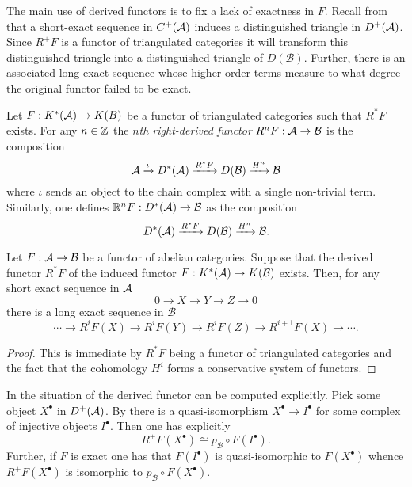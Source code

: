 The main use of derived functors is to fix a lack of exactness in $F$.
Recall from  that a short-exact sequence in $C^+(\AA)$ induces a distinguished triangle in $D^+(\AA)$.
Since $R^+F$ is a functor of triangulated categories it will transform this distinguished triangle into a distinguished triangle of $D(\mathcal{B})$.
Further, there is an associated long exact sequence whose higher-order terms measure to what degree the original functor failed to be exact.
\begin{definition}
 Let $F:K^*(\AA) \to K(B)$ be a functor of triangulated categories such that $R^*F$ exists.
 For any $n\in \Z$ the {\it $n$th right-derived functor} $R^nF:\AA \to \mathcal{B}$ is the composition
 $$\AA\xrightarrow{\iota} D^*(\AA) \xrightarrow{R^*F} D(\mathcal{B}) \xrightarrow{H^n} \mathcal{B} $$
 where $\iota$ sends an object to the chain complex with a single non-trivial term.
 Similarly, one defines $\mathbb{R}^nF:D^*(\AA)\to \mathcal{B}$ as the composition
 $$D^*(\AA) \xrightarrow{R^*F} D(\mathcal{B}) \xrightarrow{H^n} \mathcal{B}. $$
\end{definition}
\begin{proposition}
   Let $F:\AA\to \mathcal{B}$ be a functor of abelian categories.
   Suppose that the derived functor $R^*F$ of the induced functor $F:K^*(\AA)\to K(\mathcal{B})$ exists.
   Then, for any short exact sequence in $\AA$
   $$0\to X \to Y \to Z \to 0 $$
   there is a long exact sequence in $\mathcal{B}$
   $$ \cdots \to R^{i}F(X)\to R^{i}F(Y) \to R^iF(Z) \to R^{i+1}F(X)\to \cdots. $$
\end{proposition}
\begin{proof}
  This is immediate by $R^*F$ being a functor of triangulated categories and the fact that the cohomology $H^i$ forms a conservative system of functors.
\end{proof}
In the situation of  the derived functor can be computed explicitly.
Pick some object $X^\bullet$ in $D^+(\AA)$.
By  there is a quasi-isomorphism $X^\bullet\to I^\bullet$ for some complex of injective objects $I^\bullet$.
Then one has explicitly
$$R^+F(X^\bullet) \cong p_\mathcal{B} \circ F(I^\bullet). $$
Further, if $F$ is exact one has that $F(I^\bullet)$ is quasi-isomorphic to $F(X^\bullet)$ whence $R^+F(X^\bullet)$ is isomorphic to $p_\mathcal{B}\circ F(X^\bullet)$.

